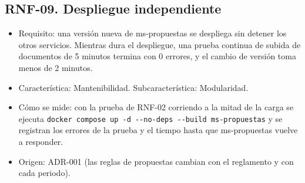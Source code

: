 \subsection*{RNF-09. Despliegue independiente}
\begin{itemize}
  \item Requisito: una versión nueva de ms-propuestas se despliega sin detener los otros servicios. Mientras dura el despliegue, una prueba continua de subida de documentos de 5 minutos termina con 0 errores, y el cambio de versión toma menos de 2 minutos.
  \item Característica: Mantenibilidad. Subcaracterística: Modularidad.
  \item Cómo se mide: con la prueba de RNF-02 corriendo a la mitad de la carga se ejecuta \texttt{docker compose up -d -{}-no-deps -{}-build ms-propuestas} y se registran los errores de la prueba y el tiempo hasta que ms-propuestas vuelve a responder.
  \item Origen: ADR-001 (las reglas de propuestas cambian con el reglamento y con cada periodo).
\end{itemize}
